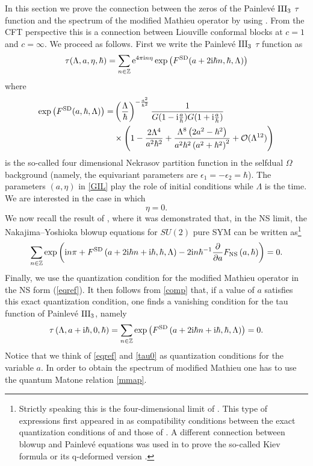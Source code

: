 \documentclass[a4paper,11pt]{article}
\theoremstyle{definition}
\def\IZ{{\mathbb Z}}
\newcommand{\re}{{\rm e}}
\newcommand{\ri}{{\rm i}}
\newcommand{\be}{\begin{equation}}
\newcommand{\ee}{\end{equation}}
\newcommand{\ba}{\begin{aligned}}
\newcommand{\ea}{\end{aligned}}
\def\IZ{\mathbb{Z}}
\begin{document}
In this section we prove the connection between the zeros of the Painlev\'e $\rm III_3$ $\tau$ function and the spectrum of the modified Mathieu operator by using \cite{ggu}. 
From the CFT perspective this is a connection between Liouville conformal blocks at $c=1$ and $c=\infty$. We proceed as follows. 
First we  write the Painlev\'e $\rm III_3$ $\tau$ function as \cite{gil,ilt,Gavrylenko:2017lqz}
%
\be
 \label{GIL} \tau(\Lambda, a, \eta, \hbar)= \sum_{n \in \IZ}  \re^{4 \pi \ri n \eta} \exp\left(F^{\rm SD}(a+2\ri\hbar n, \hbar, \Lambda)\right)
 \ee
where
%
\be
\ba  \exp\left(F^{\rm SD}(a, \hbar, \Lambda)\right)= &\left(\frac{\Lambda }{\hbar }\right)^{-\frac{  a^2}{\hbar ^2}} {1 \over  G(1-\ri \frac{a}{\hbar })G(1+\ri \frac{a}{\hbar })}\\
&\times \left(1 -\frac{2\Lambda ^4}{ a^2 \hbar ^2}+\frac{\Lambda ^8 \left(2 a^2 -\hbar ^2\right)}{ a^2 \hbar ^2 \left( a^2+\hbar ^2\right)^2}+\mathcal{O}(\Lambda^{12})\right)\ea
\ee
%
is the so-called four dimensional Nekrasov partition function in the selfdual $\Omega$ background \cite{n} (namely, the equivariant parameters are $\epsilon_1=-\epsilon_2=\hbar$).
The parameters $(a, \eta)$ in \eqref{GIL} play the role of initial conditions while $\Lambda$ is the time.
We are interested in the case in which 
% 
\be \eta=0.
\ee  
%
We now recall the result of
\cite{ggu}, where it was demonstrated that, in the NS limit, the
Nakajima--Yoshioka blowup equations for $SU(2)$ pure SYM
\cite{ny1,naga,nagalect} can be written as\footnote{Strictly speaking this
  is the four-dimensional limit of \cite{ggu}. This type of
  expressions first appeared in \cite{swh} as compatibility conditions
  between the exact quantization conditions of \cite{ghm,cgm} and
  those of \cite{wzh,fhm,hm}. A different connection between blowup and Painlev\'e equations was used in \cite{bes, Bershtein:2018zcz,ntalkbu} to prove the so-called Kiev formula \cite{gil,ilte} or its q-deformed version \cite{bsu, jns-qp}.
  }
%
\be\label{comp}
		\sum_{n\in\mathbb{Z} }
		\exp\left(\ri n  \pi+{F}^{\rm SD}\left(a+ 2\ri\hbar n+\ri\hbar, \hbar, \Lambda\right)
		 -2 \ri n\hbar^{-1}\frac{\partial }{\partial a}{F}_{\text{NS}}\left(a,\hbar\right)\right)=0.
\ee
%
Finally, we use the quantization condition for the modified Mathieu operator in the NS form (\ref{eqref}). It then follows from \eqref{comp} that, if a value of 
$a$ satisfies this exact quantization condition, one finds a vanishing condition for the tau function of
Painlev\'e $\rm III_3$, namely
%
\be\label{tau0}
 \tau\left(\Lambda, a+{\ri \hbar}, 0, \hbar \right)=\sum_{n\in\mathbb{Z} }
		\exp\left({F}^{\rm SD}\left(a+ 2\ri\hbar n+\ri\hbar, \hbar, \Lambda\right) \right)=0.\ee
%
Notice that we think of \eqref{eqref} and \eqref{tau0} as quantization conditions for the variable $a$. In order to obtain the spectrum of modified Mathieu one has to use the quantum Matone relation \eqref{mmap}.
\end{document}

